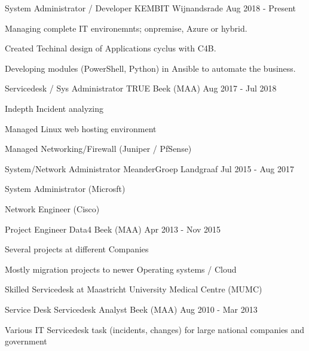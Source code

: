 \documentclass[11pt, letterpaper]{awesome-cv}
\begin{document}
\begin{cventries}


  \cventry
    {System Administrator / Developer}
    {KEMBIT}
    {Wijnandsrade}
    {Aug 2018 - Present}
    {
      \begin{cvitems}
        \item{Managing complete IT environemnts; onpremise, Azure or hybrid.}
        \item{Created Techinal design of Applications cyclus with C4B.}
        \item{Developing modules (PowerShell, Python) in Ansible to automate the business.}
      \end{cvitems}
    }


  \cventry
    {Servicedesk / Sys Administrator}
    {TRUE}
    {Beek (MAA)}
    {Aug 2017 - Jul 2018}
    {
      \begin{cvitems}
        \item{Indepth Incident analyzing}
        \item{Managed Linux web hosting environment}
        \item{Managed Networking/Firewall (Juniper / PfSense)}
      \end{cvitems}
    }


  \cventry
    {System/Network Administrator}
    {MeanderGroep}
    {Landgraaf}
    {Jul 2015 - Aug 2017}
    {
      \begin{cvitems}
        \item{System Administrator (Microsft)}
        \item{Network Engineer (Cisco)}
      \end{cvitems}
    }


  \cventry
    {Project Engineer}
    {Data4}
    {Beek (MAA)}
    {Apr 2013 - Nov 2015}
    {
      \begin{cvitems}
        \item{Several projects at different Companies}
        \item{Mostly migration projects to newer Operating systems / Cloud}
        \item{Skilled Servicedesk at Maastricht University Medical Centre (MUMC)}
      \end{cvitems}
    }


  \cventry
    {Service Desk}
    {Servicedesk Analyst}
    {Beek (MAA)}
    {Aug 2010 - Mar 2013}
    {
      \begin{cvitems}
        \item{Various IT Servicedesk task (incidents, changes) for large national companies and government}
      \end{cvitems}
    }



\end{cventries}
\end{document}
